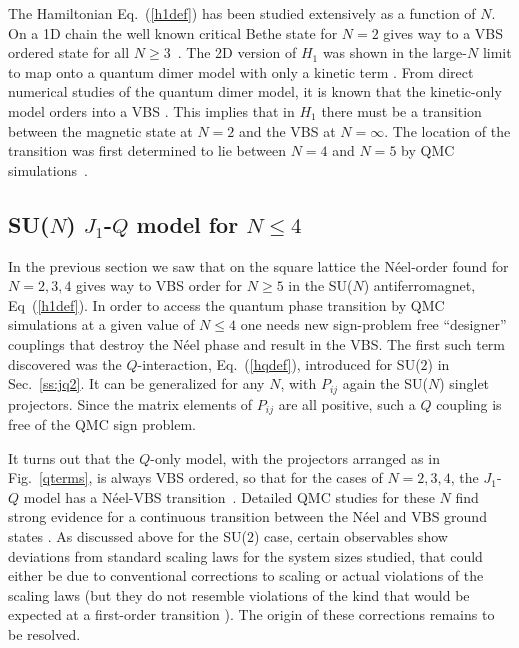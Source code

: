 \documentclass[10pt,pre,aps,twocolumn,showpacs,superscriptaddress,floatfix]{revtex4-1}
\begin{document}
The Hamiltonian Eq.~(\ref{h1def}) has been studied extensively as a function of $N$. On a 1D chain the well known critical Bethe state for $N=2$ gives way to a 
VBS ordered state for all $N\geq 3$~\cite{barber1989:d1n3_vbs,klumper1989:d1n3_vbs,affleck1985:lgN}. The 2D version of $H_{1}$ was shown 
in the large-$N$ limit to map onto a quantum dimer model with only a kinetic term \cite{read1989:nucphysB}. From direct numerical studies of the quantum dimer model, 
it is known that the kinetic-only model orders into a VBS \cite{sachdev1989:qd_vbs, Syljuasen06}.  This implies that in $H_{1}$ there must be a transition between the 
magnetic state at $N=2$ and the VBS at $N=\infty$.  The location of the transition was first determined to lie between $N=4$ and $N=5$ 
by QMC simulations~\cite{harada2003:sun,Kawashima07}.


\subsection{SU($N$) $J_1$-$Q$ model for $N\leq 4$}
\label{ss:jqN}

In the previous section we saw that on the square lattice the N\'eel-order found for $N=2,3,4$ gives way to VBS
order for $N\geq 5$ in the SU($N$) antiferromagnet, Eq~(\ref{h1def}). In order to access the quantum phase transition by QMC simulations at a 
given value of $N\leq 4$ one needs new sign-problem free ``designer'' couplings that destroy the N\'eel phase and result in the VBS. The first such term discovered 
was the $Q$-interaction, Eq.~(\ref{hqdef}), introduced for SU($2$) in Sec.~\ref{ss:jq2}. It can be generalized for any $N$, with $P_{ij}$ again 
the SU($N$) singlet projectors. Since the matrix elements of $P_{ij}$ are all positive, such a $Q$ coupling is free of the QMC sign problem. 

It turns out that the $Q$-only model, with the projectors arranged as in Fig.~\ref{qterms}, is always VBS ordered, so that for the cases of $N=2,3,4$, 
the $J_1$-$Q$ model has a N\'eel-VBS transition~\cite{Sandvik07,lou2009:sun}. Detailed QMC studies for these $N$ find strong evidence for a 
continuous transition between the N\'eel and VBS ground states \cite{melko2008:jq,kaul2011:su34,banerjee2010:log,banerjee2010:su3}. 
As discussed above for the SU($2$) case, certain observables show deviations from standard scaling laws for the system sizes studied, that could either 
be due to conventional corrections to scaling or actual violations of the scaling laws (but they do not resemble violations of the kind that would be 
expected at a first-order transition \cite{Sandvik10c}). The origin of these corrections remains to be resolved.
\end{document}
